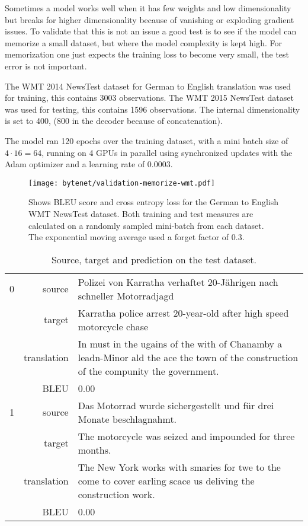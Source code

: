 Sometimes a model works well when it has few weights and low dimensionality but breaks for higher dimensionality because of vanishing or exploding gradient issues. To validate that this is not an issue a good test is to see if the model can memorize a small dataset, but where the model complexity is kept high. For memorization one just expects the training loss to become very small, the test error is not important.

The WMT 2014 NewsTest dataset for German to English translation was used for training, this contains 3003 observations. The WMT 2015 NewsTest dataset was used for testing, this contains 1596 observations. The internal dimensionality is set to 400, (800 in the decoder because of concatenation).

The model ran 120 epochs over the training dataset, with a mini batch size of ${4 \cdot 16 = 64}$, running on 4 GPUs in parallel using synchronized updates with the Adam optimizer and a learning rate of 0.0003.

\begin{figure}[h]
    \centering
    \texttt{[image: bytenet/validation-memorize-wmt.pdf]}
    \caption{Shows BLEU score and cross entropy loss for the German to English WMT NewsTest dataset. Both training and test measures are calculated on a randomly sampled mini-batch from each dataset. The exponential moving average used a forget factor of $0.3$.}
    \label{fig:result:bytenet:wmt}
\end{figure}

\begin{table}[h]
\centering
\begin{tabular}{l|r|p{10cm}}
  0 & source & Polizei von Karratha verhaftet 20-Jährigen nach schneller Motorradjagd \\[0.1cm]
    & target & Karratha police arrest 20-year-old after high speed motorcycle chase \\[0.1cm]
    & translation & In must in the ugains of the with of Chanamby a leadn-Minor ald the ace the town of the construction of the compunity the government. \\[0.1cm]
    & BLEU & 0.00 \\[0.1cm] \hline
  1 & source & Das Motorrad wurde sichergestellt und für drei Monate beschlagnahmt. \\[0.1cm]
    & target & The motorcycle was seized and impounded for three months. \\[0.1cm]
    & translation & The New York works with smaries for twe to the come to cover earling scace us deliving the construction work. \\[0.1cm]
    & BLEU & 0.00
\end{tabular}
\caption{Source, target and prediction on the test dataset.}
\label{table:result:bytenet:wmt-test}
\end{table}

